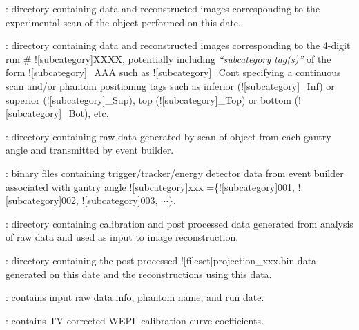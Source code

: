 \begin{tcbenvironment}
\begin{tcbparagraph}
\begin{ThinEnum}
\begin{ThinEnum}
\begin{ThinEnum}
                \item {} : directory containing data and reconstructed images corresponding to the experimental scan of the object performed on this date.
                \begin{ThinEnum}
                    \item {} : directory containing data and reconstructed images corresponding to the 4-digit run \# \docentry![subcategory]{XXXX}, potentially including \emph{``subcategory tag(s)''} of the form \docentry![subcategory]{\_AAA} such as  \docentry![subcategory]{\_Cont} specifying a continuous scan and/or phantom positioning tags such as inferior (\docentry![subcategory]{\_Inf}) or superior (\docentry![subcategory]{\_Sup}), top (\docentry![subcategory]{\_Top}) or bottom (\docentry![subcategory]{\_Bot}), etc.
                    \begin{ThinEnum}
                        \item {} : directory containing raw data generated by scan of object from each gantry angle and transmitted by event builder.
                        \begin{ThinEnum}
                            \item {} : binary files containing trigger/tracker/energy detector data from event builder associated with gantry angle \docentry![subcategory]{xxx} =\{\docentry![subcategory]{001}, \docentry![subcategory]{002}, \docentry![subcategory]{003}, $\cdots\}$.
                        \end{ThinEnum}
                        \item {} : directory containing calibration and post processed data generated from analysis of raw data and used as input to image reconstruction.
                        \begin{ThinEnum}
                            \item {} : directory containing the post processed \docentry![fileset]{projection\_xxx.bin} data generated on this date and the reconstructions using this data.
                            \begin{ThinEnum}
                                \item {} : contains input raw data info, phantom name, and run date.
                    			\item {} : contains TV corrected WEPL calibration curve coefficients.

\end{ThinEnum}
\end{ThinEnum}
\end{ThinEnum}
\end{ThinEnum}
\end{ThinEnum}
\end{ThinEnum}
\end{ThinEnum}
\end{tcbparagraph}
\end{tcbenvironment}
